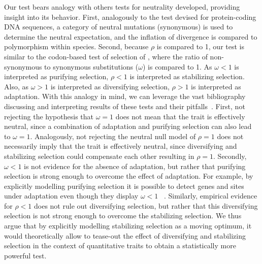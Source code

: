 \documentclass{article}
\newcommand{\NI}{\rho}
\begin{document}
Our test bears analogy with others tests for neutrality developed, providing insight into its behavior.
First, analogously to the \textcite{mcdonald_adaptative_1991} test devised for protein-coding DNA sequences, a category of neutral mutations (synonymous) is used to determine the neutral expectation, and the inflation of divergence is compared to polymorphism within species.
Second, because $\NI$ is compared to 1, our test is similar to the codon-based test of selection of \textcite{goldman_codonbased_1994, muse_likelihood_1994}, where the ratio of non-synonymous to synonymous substitutions ($\omega$) is compared to 1.
As $\omega < 1$ is interpreted as purifying selection, $\NI < 1$ is interpreted as stabilizing selection.
Also, as $\omega > 1$ is interpreted as diversifying selection, $\NI > 1$ is interpreted as adaptation.
With this analogy in mind, we can leverage the vast bibliography discussing and interpreting results of these tests and their pitfalls~\cite{nielsen_molecular_2005, anisimova_investigating_2009, jensen_importance_2019}.
First, not rejecting the hypothesis that $\omega = 1$ does not mean that the trait is effectively neutral, since a combination of adaptation and purifying selection can also lead to $\omega = 1$\cite{nielsen_molecular_2005}.
Analogously, not rejecting the neutral null model of $\NI = 1$ does not necessarily imply that the trait is effectively neutral, since diversifying and stabilizing selection could compensate each other resulting in $\NI = 1$.
Secondly, $\omega < 1$ is not evidence for the absence of adaptation, but rather that purifying selection is strong enough to overcome the effect of adaptation.
For example, by explicitly modelling purifying selection it is possible to detect genes and sites under adaptation even though they display $\omega < 1$ ~\cite{latrille_genes_2023}.
Similarly, empirical evidence for $\NI < 1$ does not rule out diversifying selection, but rather that this diversifying selection is not strong enough to overcome the stabilizing selection.
We thus argue that by explicitly modelling stabilizing selection as a moving optimum, it would theoretically allow to tease-out the effect of diversifying and stabilizing selection in the context of quantitative traits to obtain a statistically more powerful test.
\end{document}
